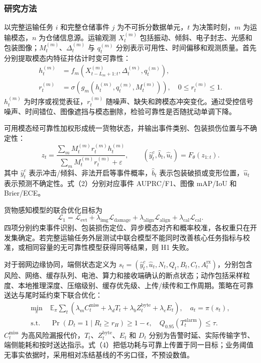\justifying
\NSFCBodyText

\subsubsection{研究方法}

以完整运输任务 $i$ 和完整仓储事件 $j$ 为不可拆分数据单元，$t$ 为决策时刻，$m$ 为运输模态，$n$ 为仓储信息源。运输观测 $X_t^{(m)}$ 包括振动、倾斜、电子封志、光感和包装图像；$M_t^{(m)}$、$\Delta_t^{(m)}$ 与 $q_t^{(m)}$ 分别表示可用性、时间偏移和观测质量。首先分别提取模态内特征并估计时变可靠性：
\[
\begin{aligned}
h_t^{(m)}&=f_m\!\left(X_{t-L_m+1:t}^{(m)},\Delta_t^{(m)},q_t^{(m)}\right),\\
r_t^{(m)}&=\sigma\!\left(g_m(h_t^{(m)},q_t^{(m)},M_t^{(m)})\right),\quad 0\le r_t^{(m)}\le1.
\end{aligned}
\tag{1}
\]
$h_t^{(m)}$ 为时序或视觉表征，$r_t^{(m)}$ 随噪声、缺失和跨模态冲突变化。通过受控信号噪声、时间错位、图像遮挡与模态删除，检验可靠性是否随扰动单调下降。

可用模态经可靠性加权形成统一货物状态，并输出事件类别、包装损伤位置与不确定性：
\[
z_t=\frac{\sum_m M_t^{(m)}r_t^{(m)}h_t^{(m)}}
{\sum_m M_t^{(m)}r_t^{(m)}+\varepsilon},\qquad
(\hat y_t^{c},\hat b_t,\hat u_t)=F_\theta(z_{1:t}).
\tag{2}
\]
其中 $\hat y_t^{c}$ 表示冲击/倾斜、非法开启等事件概率，$\hat b_t$ 表示包装破损或变形位置，$\hat u_t$ 表示预测不确定性。式（2）分别对应事件 AUPRC/F1、图像 mAP/IoU 和 Brier/ECE。

货物感知模型的联合优化目标为
\[
\mathcal L_{1}=\mathcal L_{\mathrm{evt}}
+\lambda_{\mathrm{img}}\mathcal L_{\mathrm{damage}}
+\lambda_{\mathrm{align}}\mathcal L_{\mathrm{align}}
+\lambda_{\mathrm{cal}}\mathcal L_{\mathrm{cal}}.
\tag{3}
\]
四项分别约束事件识别、包装损伤定位、异步模态对齐和概率校准，各权重只在开发集确定。若完整运输任务外层测试中联合模型不能同时改善核心任务指标与校准，或相同容量的无可靠性模型获得同等结果，则 H1 失败。

对于弱网边缘协同，端侧状态定义为 $s_t=(\hat y_t^{c},\hat u_t,N_t,Q_t,B_t,C_t,A_t^{\mathrm{rx}})$，分别包含风险、网络、缓存队列、电池、算力和接收端确认的断点状态；动作包括采样粒度、本地推理深度、压缩级别、缓存优先级、上传/续传和工作周期。策略在可靠送达与尾时延约束下联合优化：
\[
\begin{aligned}
\min_{\pi}\;&\mathbb E_{\pi}\sum_t
\left(\lambda_m C_t^{\mathrm{miss}}+\lambda_d T_t
+\lambda_b Z_t^{\mathrm{byte}}+\lambda_e E_t\right),\quad a_t=\pi(s_t),\\
\mathrm{s.t.}\;&\Pr(D_t=1\mid R_t\ge r_H)\ge1-\epsilon,\quad
Q_{0.95}(T_t^{\mathrm{alarm}})\le\tau .
\end{aligned}
\tag{4}
\]
$C_t^{\mathrm{miss}}$ 为高风险漏报代价，$T_t$、$Z_t^{\mathrm{byte}}$、$E_t$ 和 $D_t$ 分别为告警时延、实际传输字节、端侧能耗和按时送达指示。式（4）把低功耗与可靠上传置于同一目标；业务阈值无事实依据时，采用相对冻结基线的不劣口径，不预设数值。

